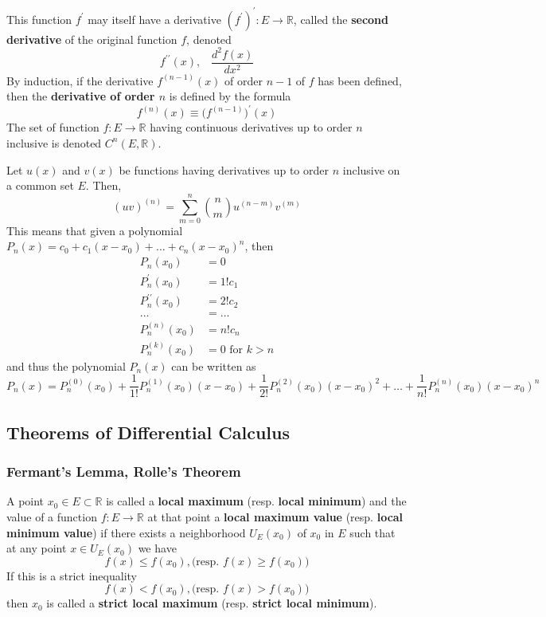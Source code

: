     \begin{definition}
      This function $f^\prime$ may itself have a derivative $(f^\prime)^\prime : E \longrightarrow \mathbb{R}$, called the \textbf{second derivative} of the original function $f$, denoted 
      \[f^{\prime\prime} (x), \;\;\; \frac{d^2 f(x)}{dx^2}\]
      By induction, if the derivative $f^{(n-1)} (x)$ of order $n-1$ of $f$ has been defined, then the \textbf{derivative of order $n$} is defined by the formula
      \[f^{(n)} (x) \equiv \big(f^{(n-1)}\big)^\prime (x)\]
      The set of function $f: E \longrightarrow \mathbb{R}$ having continuous derivatives up to order $n$ inclusive is denoted $C^{n} (E, \mathbb{R})$. 
    \end{definition}

    \begin{lemma}
      Let $u(x)$ and $v(x)$ be functions having derivatives up to order $n$ inclusive on a common set $E$. Then, 
      \[(uv)^{(n)} = \sum_{m = 0}^n \binom{n}{m} u^{(n-m)} v^{(m)}\]
      This means that given a polynomial $P_n (x) = c_0 + c_1 (x - x_0) + \ldots + c_n (x - x_0)^n$, then 
      \begin{align*}
          P_n(x_0) & = 0 \\
          P_n^\prime (x_0) & = 1! c_1 \\
          P_n^{\prime\prime} (x_0) & = 2! c_2 \\
          \ldots & = \ldots \\
          P_n^{(n)} (x_0) & = n! c_n \\
          P_n^{(k)} (x_0) & = 0 \text{ for } k > n
      \end{align*}
      and thus the polynomial $P_n (x)$ can be written as
      \[P_n (x) = P_n^{(0)} (x_0) + \frac{1}{1!} P_n^{(1)} (x_0) (x-x_0) + \frac{1}{2!} P_n^{(2)} (x_0) (x-x_0)^2 + \ldots + \frac{1}{n!} P_n^{(n)} (x_0) (x-x_0)^n\]
    \end{lemma}

\subsection{Theorems of Differential Calculus}

  \subsubsection{Fermant's Lemma, Rolle's Theorem}

  \begin{definition}
    A point $x_0 \in E \subset \mathbb{R}$ is called a \textbf{local maximum} (resp. \textbf{local minimum}) and the value of a function $f: E \longrightarrow \mathbb{R}$ at that point a \textbf{local maximum value} (resp. \textbf{local minimum value}) if there exists a neighborhood $U_E (x_0)$ of $x_0$ in $E$ such that at any point $x \in U_E (x_0)$ we have 
    \[f(x) \leq f(x_0), \big( \text{resp. } f(x) \geq f(x_0) \big)\]
    If this is a strict inequality
    \[f(x) < f(x_0), \big( \text{resp. } f(x) > f(x_0) \big)\]
    then $x_0$ is called a \textbf{strict local maximum} (resp. \textbf{strict local minimum}). 
  \end{definition}

